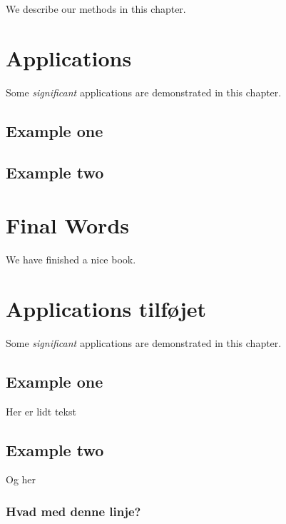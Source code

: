\documentclass[]{book}
\theoremstyle{definition}
\theoremstyle{definition}
\theoremstyle{definition}
\theoremstyle{remark}
\begin{document}
We describe our methods in this chapter.

\hypertarget{applications}{%
\chapter{Applications}\label{applications}}

Some \emph{significant} applications are demonstrated in this chapter.

\hypertarget{example-one}{%
\section{Example one}\label{example-one}}

\hypertarget{example-two}{%
\section{Example two}\label{example-two}}

\hypertarget{final-words}{%
\chapter{Final Words}\label{final-words}}

We have finished a nice book.

\hypertarget{applications-tilfjet}{%
\chapter{Applications tilføjet}\label{applications-tilfjet}}

Some \emph{significant} applications are demonstrated in this chapter.

\hypertarget{example-one-1}{%
\section{Example one}\label{example-one-1}}

Her er lidt tekst

\hypertarget{example-two-1}{%
\section{Example two}\label{example-two-1}}

Og her

\hypertarget{hvad-med-denne-linje}{%
\subsection{Hvad med denne linje?}\label{hvad-med-denne-linje}}


\end{document}
